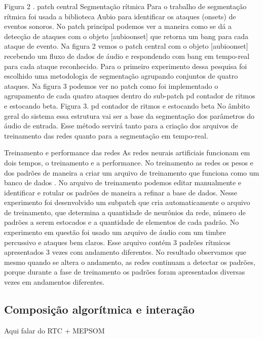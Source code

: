 \documentclass[draft]{ppgmus}
\begin{document}
Figura 2 . patch central
 Segmentação rítmica
Para o trabalho de segmentação rítmica foi usada a biblioteca Aubio para identificar os ataques (onsets) de eventos 
sonoros. No patch principal podemos ver a maneira como se dá a detecção de ataques com o objeto [aubioonset\texttildelow] que retorna 
um bang para cada ataque de evento. Na figura 2 vemos o patch central com o objeto  [aubioonset\texttildelow] recebendo um fluxo de 
dados de áudio e respondendo com bang em tempo-real para cada ataque reconhecido.
   Para o primeiro experimento dessa pesquisa foi escolhido uma
metodologia de segmentação agrupando conjuntos de quatro ataques. Na figura 3 podemos ver no patch como foi implementado 
o agrupamento de cada quatro  ataques dentro do sub-patch pd contador de ritmos e estocando beta.
Figura 3. pd contador de ritmos e estocando beta
No âmbito geral do sistema essa estrutura vai ser a base da segmentação dos parâmetros do áudio de entrada. Esse método 
servirá tanto para  a criação dos arquivos de treinamento das redes quanto para a segmentação em tempo-real.

 Treinamento e performance das redes
As redes neurais artificiais funcionam em dois tempos, o treinamento e a performance. No treinamento as redes os pesos e 
dos padrões de maneira a criar um arquivo de treinamento que funciona como um banco de dados . No arquivo de treinamento 
podemos editar manualmente e identificar e rotular os padrões de maneira a refinar a base de dados. Nesse experimento foi 
desenvolvido um subpatch que cria automaticamente o arquivo de treinamento, que determina a quantidade de neurônios da 
rede, número de padrões a serem estocados e a quantidade de elementos de cada padrão.
   No experimento em questão foi usado um arquivo de áudio com um timbre percussivo e ataques bem claros. Esse arquivo 
contém 3 padrões rítmicos apresentados 3 vezes com  andamento diferentes. No resultado observamos que mesmo quando se 
altera o andamento, as redes continuam a detectar os padrões, porque durante a fase de treinamento os padrões foram 
apresentados diversas vezes em andamentos diferentes.






\subsection{Composição algorítmica e interação}



Aqui falar do RTC + MEPSOM
\end{document}
